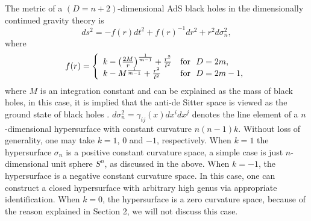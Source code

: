\documentclass[a4paper,12pt]{article}
\begin{document}
The metric of a $(D=n+2)$-dimensional AdS black holes in the dimensionally
continued gravity theory is \cite{CS,Bano}
\begin{equation}
\label{4eq1}
ds^2 =- f(r) dt^2 +f(r)^{-1} dr^2 + r^2 d\sigma^2_n,
\end{equation}
where
\begin{equation}
f(r) = \left \{
\begin{array}{ll}
 k-\left(\frac{2M}{r}\right)^{\frac{1}{m-1}} +\frac{r^2}{l^2} & {\rm for}\ \
   D=2m, \\
 k-M^{\frac{1}{m-1}} +\frac{r^2}{l^2} & {\rm for}\ \ D =2m -1,
\end{array} \right.
\end{equation}
where $M$ is an integration constant and can be explained as 
the mass of black holes, in this case, it is implied that the anti-de Sitter
space is viewed as the ground state of black holes \cite{CS}. 
$d\sigma_n^2=\gamma_{ij}(x)dx^idx^j$
denotes the line element of a $n$-dimensional hypersurface with constant
curvature $n(n-1)k$. Without loss of generality, one may take $k=1$, $0$ and 
$-1$, respectively. When $k=1$ the hypersurface $\sigma_n$ is a positive 
constant curvature space, a simple case is just $n$-dimensional unit 
sphere $S^n$, as discussed in the above. When $k=-1$, the hypersurface is a 
negative constant curvature space. In this case, one can construct a closed 
hypersurface with arbitrary high genus via appropriate identification. 
When $k=0$, the hypersurface is a zero curvature space, because of the reason
explained in Section 2, we will not discuss this case. 
\end{document}
